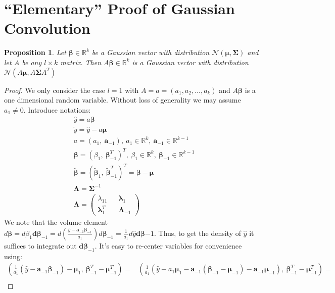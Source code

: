 \documentclass[10pt,fleqn]{amsart}
\newtheorem{proposition}[theorem]{Proposition}
\theoremstyle{definition}
\theoremstyle{remark}
\numberwithin{equation}{section}
\newcommand{\aaa}{\boldsymbol{a}}
\newcommand{\RR}{\mathbb{R}}
\newcommand{\bbeta}{\boldsymbol{\beta}}
\newcommand{\mmu}{\boldsymbol{\mu}}
\newcommand{\SSigma}{\boldsymbol{\Sigma}}
\newcommand{\llambda}{\boldsymbol{\lambda}}
\newcommand{\LLambda}{\boldsymbol{\Lambda}}
\newcommand{\bbetatilde}{\widetilde{\bbeta}}
\newcommand{\yhat}{\widehat{y}}
\newcommand{\ytilde}{\widetilde{y}}
\begin{document}
\appendix\section{``Elementary'' Proof of Gaussian Convolution}\label{appendix_gauss_conv}
\begin{proposition}
    Let $\bbeta\in\RR^k$ be a Gaussian vector with distribution $\mathcal{N}(\mmu,\SSigma)$ and let $A$ be any $l\times k$ matrix.
    Then $A\bbeta\in\RR^k$ is a Gaussian vector with distribution $\mathcal{N}(A\mmu,A\SSigma A^T)$
\end{proposition}
\begin{proof} We only consider the case $l=1$ with $A=a=(a_1,a_2,\ldots,a_k)$ and $A\bbeta$ is a one dimensional random variable.
Without loss of generality we may assume $a_1\neq 0$. Introduce notations:
\begin{align}
    &\yhat = a\bbeta\\
    &\ytilde=\yhat-a\mmu\\
    &a = \left(a_1,\ \aaa_{-1}\right),\ a_1\in\RR^k,\ \aaa_{-1}\in\RR^{k-1}\\
    &\bbeta = \left(\beta_1,\ \bbeta_{-1}^T\right)^T,\ \beta_1\in\RR^k,\ \bbeta_{-1}\in\RR^{k-1}\\
    &\bbetatilde=\left(\bbetatilde_1,\ \bbetatilde_{-1}^T\right)^T=\bbeta-\mmu\\
    &\LLambda=\SSigma^{-1}\\
    &\LLambda=\left(\begin{matrix}
        \lambda_{11} && \llambda_1\\
        \llambda_1^T && \LLambda_{-1}
    \end{matrix}\right)
\end{align}
We note that the volume element
$\displaystyle d\bbeta=d\beta_1\boldsymbol{d}\bbeta_{-1}=d\left(\frac{\yhat-\aaa_{-1}\bbeta_{-1}}{a_1}\right)d\bbeta_{-1}=\frac 1{a_1}d\yhat\boldsymbol{d}\bbeta{-1}$.
Thus, to get the density of $\yhat$ it suffices to integrate out $\boldsymbol{d}\bbeta_{-1}$. It's easy to re-center variables for convenience using:
\begin{equation*}\begin{split}
    \left(\frac{1}{a_1}\left(\yhat-\aaa_{-1}\bbeta_{-1}\right)-\mmu_1,\ \bbeta_{-1}^T-\mmu_{-1}^T\right)=&\left(\frac{1}{a_1}\left(\yhat-a_1\mmu_1-\aaa_{-1}\left(\bbeta_{-1}-\mmu_{-1}\right)-\aaa_{-1}\mmu_{-1}\right),\ \bbeta_{-1}^T-\mmu_{-1}^T\right)=\\

\end{split}
\end{equation*}
\end{proof}
\end{document}
